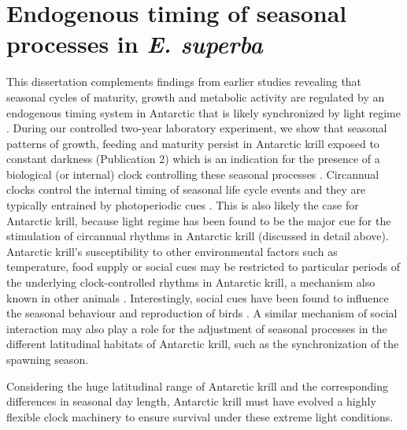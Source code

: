 
\section{Endogenous timing of seasonal processes in \textit{E. superba}}

This dissertation complements findings from earlier studies revealing that
seasonal cycles of maturity, growth and metabolic activity are regulated by an
endogenous timing system in Antarctic that is likely synchronized by light
regime \citep{brown_flexible_2011, brown_long-term_2013,
piccolin_seasonal_2018}. During our controlled two-year laboratory experiment,
we show that seasonal patterns of growth, feeding and maturity persist in
Antarctic krill exposed to constant darkness (Publication 2) which is an
indication for the presence of a biological (or internal) clock controlling
these seasonal processes \citep{visser_phenology_2010}.  Circannual clocks
control the internal timing of seasonal life cycle events and they are
typically entrained by photoperiodic cues \citep{helm_annual_2013}. This is
also likely the case for Antarctic krill, because light regime has been found
to be the major cue for the stimulation of circannual rhythms in Antarctic
krill (discussed in detail above). Antarctic krill's susceptibility to other
environmental factors such as temperature, food supply or social cues may be
restricted to particular periods of the underlying clock-controlled rhythms in
Antarctic krill, a mechanism also known in other animals
\citep{visser_phenology_2010}.  Interestingly, social cues have been found to
influence the seasonal behaviour and reproduction of birds
\citep{helm_sociable_2006}. A similar mechanism of social interaction may also
play a role for the adjustment of seasonal processes in the different
latitudinal habitats of Antarctic krill, such as the synchronization of the
spawning season.

Considering the huge latitudinal range of Antarctic krill and the corresponding
differences in seasonal day length, Antarctic krill must have evolved a highly
flexible clock machinery to ensure survival under these extreme light
conditions.

